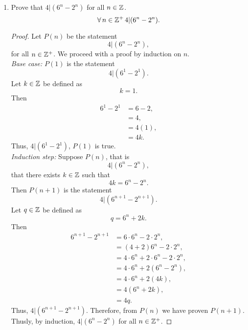 \documentclass[a4paper, 12pt]{../../config/homework}
\begin{document}
\begin{enumerate}
\pagebreak
\item Prove that $4|(6^n - 2^n)$ for all $n\in\mathbb{Z}$.
\[\forall\,n\in\mathbb{Z}^+\,4|(6^n - 2^n).\]
\begin{proof}
Let $P(n)$ be the statement
\[4|(6^n - 2^n),\]
for all $n\in\mathbb{Z}^+$.
We proceed with a proof by induction on $n$.
\\\textit{Base case:} $P(1)$ is the statement
\[4|(6^1 - 2^1).\]
Let $k\in\mathbb{Z}$ be defined as
\[k=1.\]
Then
\begin{align*}
6^1 - 2^1 &= 6 - 2,
\\&= 4,
\\&= 4(1),
\\&= 4k.
\end{align*}
Thus, $4|(6^1 - 2^1)$, $P(1)$ is true.
\\\textit{Induction step:} Suppose $P(n)$, that is
\[4|(6^n - 2^n),\]
that there exists $k\in\mathbb{Z}$ such that
\[4k = 6^n - 2^n.\]
Then $P(n+1)$ is the statement
\[4|(6^{n+1} - 2^{n+1}).\]
Let $q\in\mathbb{Z}$ be defined as
\[q = 6^n + 2k.\]
Then
\begin{align*}
6^{n+1}-2^{n+1} &= 6\cdot6^n - 2\cdot2^n,\\
&= (4+2)6^n - 2\cdot2^n,\\
&= 4\cdot6^n + 2\cdot6^n -2\cdot2^n,\\
&= 4\cdot6^n + 2(6^n-2^n),\\
&= 4\cdot6^n + 2(4k),\\
&= 4(6^n + 2k),\\
&= 4q.
\end{align*}
Thus, $4|(6^{n+1} - 2^{n+1})$. Therefore, from $P(n)$ we have proven $P(n+1)$. Thusly, by induction, $4|(6^n - 2^n)$ for all $n\in\mathbb{Z}^+$.
\end{proof}


\end{enumerate}
\end{document}
